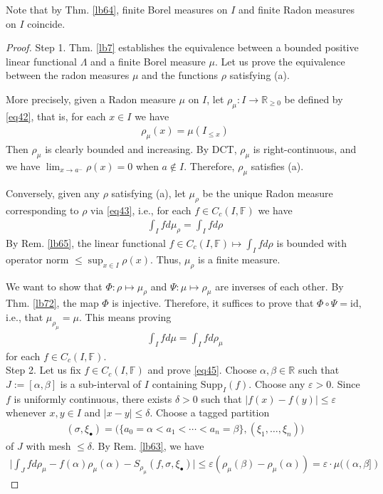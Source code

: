 \documentclass[12pt,b5paper,notitlepage]{article}
\theoremstyle{definition}
\theoremstyle{plain}
\newcommand{\id}{\mathrm{id}}
\newcommand{\blt}{\bullet}
\newcommand{\Rbb}{\mathbb R}
\newcommand{\Supp}{\mathrm{Supp}}
\newcommand{\Fbb}{\mathbb F}
\newcommand{\eps}{\varepsilon}
\numberwithin{equation}{section}
\begin{document}
Note that by Thm. \ref{lb64}, finite Borel measures on $I$ and finite Radon measures on $I$ coincide.


\begin{proof}
Step 1. Thm. \ref{lb7} establishes the equivalence between a bounded positive linear functional $\Lambda$ and a finite Borel measure $\mu$. Let us prove the equivalence between the radon measures $\mu$ and the functions $\rho$ satisfying (a).

More precisely, given a Radon measure $\mu$ on $I$, let $\rho_\mu:I\rightarrow\Rbb_{\geq0}$ be defined by \eqref{eq42}, that is, for each $x\in I$ we have 
\begin{align}\label{eq184}
\rho_\mu(x)=\mu(I_{\leq x})
\end{align}
Then $\rho_\mu$ is clearly bounded and increasing. By DCT,  $\rho_\mu$ is right-continuous, and we have $\lim_{x\rightarrow a^-}\rho(x)=0$ when $a\notin I$. Therefore, $\rho_\mu$ satisfies (a). 

Conversely, given any $\rho$ satisfying (a), let $\mu_\rho$ be the unique Radon measure corresponding to $\rho$ via \eqref{eq43}, i.e., for each $f\in C_c(I,\Fbb)$ we have
\begin{align}\label{eq46}
\int_I f d\mu_\rho=\int_I fd\rho
\end{align}
By Rem. \ref{lb65}, the linear functional $f\in C_c(I,\Fbb)\mapsto \int_Ifd\rho$ is bounded with operator norm $\leq\sup_{x\in I}\rho(x)$. Thus, $\mu_\rho$ is a finite measure.

We want to show that $\Phi:\rho\mapsto\mu_\rho$ and $\Psi:\mu\mapsto\rho_\mu$ are inverses of each other. By Thm. \ref{lb72}, the map $\Phi$ is injective. Therefore, it suffices to prove that $\Phi\circ\Psi=\id$, i.e., that $\mu_{\rho_\mu}=\mu$. This means proving
\begin{align}\label{eq45}
\int_I fd\mu=\int_Ifd\rho_\mu
\end{align}
for each $f\in C_c(I,\Fbb)$. \\[-1ex]

Step 2.  Let us fix $f\in C_c(I,\Fbb)$ and prove \eqref{eq45}. Choose $\alpha,\beta\in\Rbb$ such that $J:=[\alpha,\beta]$ is a sub-interval of $I$ containing $\Supp_I(f)$. Choose any $\eps>0$. Since $f$ is uniformly continuous, there exists $\delta>0$ such that $|f(x)-f(y)|\leq\eps$ whenever $x,y\in I$ and $|x-y|\leq\delta$. Choose a tagged partition
\begin{align*}
(\sigma,\xi_\blt)=\big(\{a_0=\alpha<a_1<\cdots<a_n=\beta\},(\xi_1,\dots,\xi_n) \big)
\end{align*}
of $J$ with mesh $\leq\delta$. By Rem. \ref{lb63}, we have
\begin{align}\label{eq44}
\Big| \int_Jfd\rho_\mu-f(\alpha)\rho_\mu(\alpha)-S_{\rho_\mu}(f,\sigma,\xi_\blt)\Big|\leq \eps(\rho_\mu(\beta)-\rho_\mu(\alpha))=\eps\cdot\mu((\alpha,\beta])
\end{align}



\end{proof}
\end{document}
